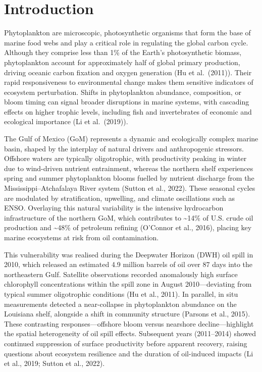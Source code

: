 \documentclass[
  11pt,
]{article}
\renewcommand*\contentsname{Table of contents}
\newcommand\contentsname{Table of contents}
\begin{document}
\renewcommand*\contentsname{Table of contents}
{
\hypersetup{linkcolor=}
\setcounter{tocdepth}{3}
\tableofcontents
}

\newpage

\section{Introduction}\label{introduction}

Phytoplankton are microscopic, photosynthetic organisms that form the
base of marine food webs and play a critical role in regulating the
global carbon cycle. Although they comprise less than 1\% of the Earth's
photosynthetic biomass, phytoplankton account for approximately half of
global primary production, driving oceanic carbon fixation and oxygen
generation (Hu et al.~(2011)). Their rapid responsiveness to
environmental change makes them sensitive indicators of ecosystem
perturbation. Shifts in phytoplankton abundance, composition, or bloom
timing can signal broader disruptions in marine systems, with cascading
effects on higher trophic levels, including fish and invertebrates of
economic and ecological importance (Li et al.~(2019)).

The Gulf of Mexico (GoM) represents a dynamic and ecologically complex
marine basin, shaped by the interplay of natural drivers and
anthropogenic stressors. Offshore waters are typically oligotrophic,
with productivity peaking in winter due to wind-driven nutrient
entrainment, whereas the northern shelf experiences spring and summer
phytoplankton blooms fuelled by nutrient discharge from the
Mississippi--Atchafalaya River system (Sutton et al., 2022). These
seasonal cycles are modulated by stratification, upwelling, and climate
oscillations such as ENSO. Overlaying this natural variability is the
intensive hydrocarbon infrastructure of the northern GoM, which
contributes to \textasciitilde14\% of U.S. crude oil production and
\textasciitilde48\% of petroleum refining (O'Connor et al., 2016),
placing key marine ecosystems at risk from oil contamination.

This vulnerability was realised during the Deepwater Horizon (DWH) oil
spill in 2010, which released an estimated 4.9 million barrels of oil
over 87 days into the northeastern Gulf. Satellite observations recorded
anomalously high surface chlorophyll concentrations within the spill
zone in August 2010---deviating from typical summer oligotrophic
conditions (Hu et al., 2011). In parallel, in situ measurements detected
a near-collapse in phytoplankton abundance on the Louisiana shelf,
alongside a shift in community structure (Parsons et al., 2015). These
contrasting responses---offshore bloom versus nearshore
decline---highlight the spatial heterogeneity of oil spill effects.
Subsequent years (2011--2014) showed continued suppression of surface
productivity before apparent recovery, raising questions about ecosystem
resilience and the duration of oil-induced impacts (Li et al., 2019;
Sutton et al., 2022).
\end{document}
